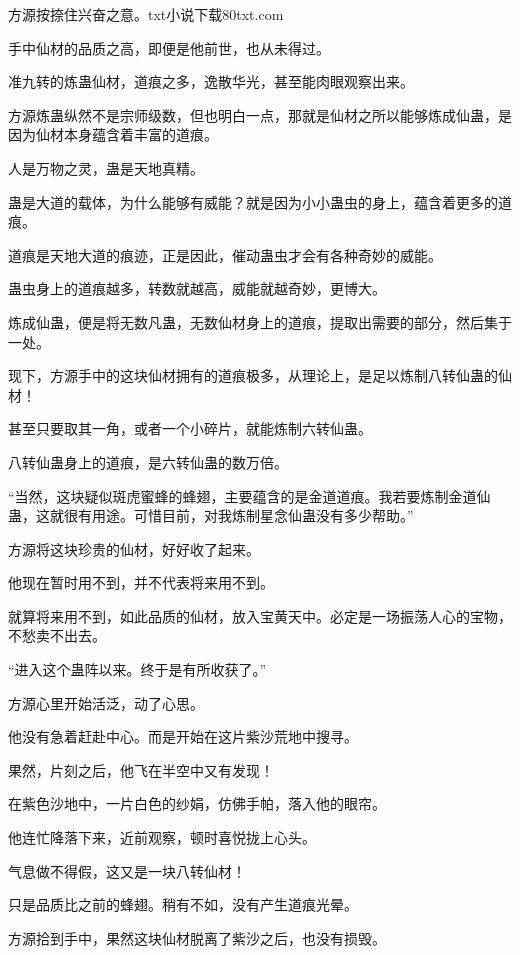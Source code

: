 
\begin{this_body}

方源按捺住兴奋之意。txt小说下载80txt.com

手中仙材的品质之高，即便是他前世，也从未得过。

准九转的炼蛊仙材，道痕之多，逸散华光，甚至能肉眼观察出来。

方源炼蛊纵然不是宗师级数，但也明白一点，那就是仙材之所以能够炼成仙蛊，是因为仙材本身蕴含着丰富的道痕。

人是万物之灵，蛊是天地真精。

蛊是大道的载体，为什么能够有威能？就是因为小小蛊虫的身上，蕴含着更多的道痕。

道痕是天地大道的痕迹，正是因此，催动蛊虫才会有各种奇妙的威能。

蛊虫身上的道痕越多，转数就越高，威能就越奇妙，更博大。

炼成仙蛊，便是将无数凡蛊，无数仙材身上的道痕，提取出需要的部分，然后集于一处。

现下，方源手中的这块仙材拥有的道痕极多，从理论上，是足以炼制八转仙蛊的仙材！

甚至只要取其一角，或者一个小碎片，就能炼制六转仙蛊。

八转仙蛊身上的道痕，是六转仙蛊的数万倍。

“当然，这块疑似斑虎蜜蜂的蜂翅，主要蕴含的是金道道痕。我若要炼制金道仙蛊，这就很有用途。可惜目前，对我炼制星念仙蛊没有多少帮助。”

方源将这块珍贵的仙材，好好收了起来。

他现在暂时用不到，并不代表将来用不到。

就算将来用不到，如此品质的仙材，放入宝黄天中。必定是一场振荡人心的宝物，不愁卖不出去。

“进入这个蛊阵以来。终于是有所收获了。”

方源心里开始活泛，动了心思。

他没有急着赶赴中心。而是开始在这片紫沙荒地中搜寻。

果然，片刻之后，他飞在半空中又有发现！

在紫色沙地中，一片白色的纱娟，仿佛手帕，落入他的眼帘。

他连忙降落下来，近前观察，顿时喜悦拢上心头。

气息做不得假，这又是一块八转仙材！

只是品质比之前的蜂翅。稍有不如，没有产生道痕光晕。

方源拾到手中，果然这块仙材脱离了紫沙之后，也没有损毁。


\end{this_body}
